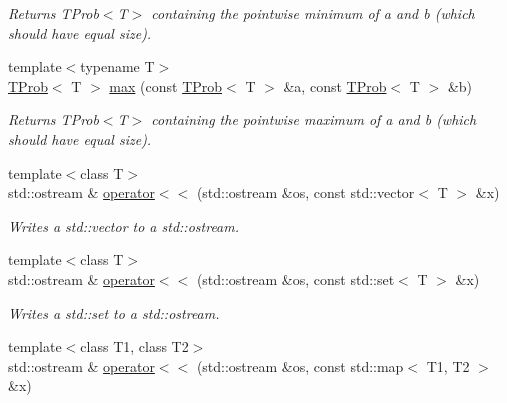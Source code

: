 \begin{CompactItemize}
\begin{CompactList}\small\item\em Returns TProb$<$T$>$ containing the pointwise minimum of a and b (which should have equal size). \item\end{CompactList}\item 
\hypertarget{namespacedai_1d1e1236b5993b3cbdca8302d5305021}{
{\footnotesize template$<$typename T$>$ }\\\hyperlink{classdai_1_1TProb}{TProb}$<$ T $>$ \hyperlink{namespacedai_1d1e1236b5993b3cbdca8302d5305021}{max} (const \hyperlink{classdai_1_1TProb}{TProb}$<$ T $>$ \&a, const \hyperlink{classdai_1_1TProb}{TProb}$<$ T $>$ \&b)}
\label{namespacedai_1d1e1236b5993b3cbdca8302d5305021}

\begin{CompactList}\small\item\em Returns TProb$<$T$>$ containing the pointwise maximum of a and b (which should have equal size). \item\end{CompactList}\item 
\hypertarget{namespacedai_1a0b1c88c46fb8763c2c783cc3fe9a62}{
{\footnotesize template$<$class T$>$ }\\std::ostream \& \hyperlink{namespacedai_1a0b1c88c46fb8763c2c783cc3fe9a62}{operator$<$$<$} (std::ostream \&os, const std::vector$<$ T $>$ \&x)}
\label{namespacedai_1a0b1c88c46fb8763c2c783cc3fe9a62}

\begin{CompactList}\small\item\em Writes a std::vector to a std::ostream. \item\end{CompactList}\item 
\hypertarget{namespacedai_4f8ad5d0c47c7fdfe17e5d0f4c0a32d9}{
{\footnotesize template$<$class T$>$ }\\std::ostream \& \hyperlink{namespacedai_4f8ad5d0c47c7fdfe17e5d0f4c0a32d9}{operator$<$$<$} (std::ostream \&os, const std::set$<$ T $>$ \&x)}
\label{namespacedai_4f8ad5d0c47c7fdfe17e5d0f4c0a32d9}

\begin{CompactList}\small\item\em Writes a std::set to a std::ostream. \item\end{CompactList}\item 
\hypertarget{namespacedai_5913957fb1c3c3d3fbd1f3102b8eb04c}{
{\footnotesize template$<$class T1, class T2$>$ }\\std::ostream \& \hyperlink{namespacedai_5913957fb1c3c3d3fbd1f3102b8eb04c}{operator$<$$<$} (std::ostream \&os, const std::map$<$ T1, T2 $>$ \&x)}
\label{namespacedai_5913957fb1c3c3d3fbd1f3102b8eb04c}


\end{CompactItemize}
